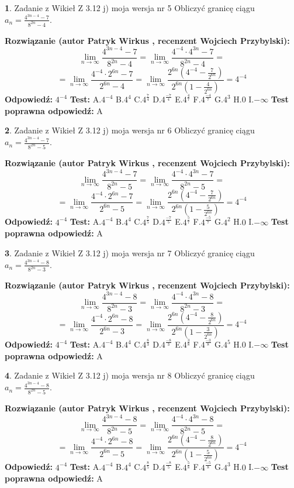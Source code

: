 \documentclass[12pt, a4paper]{article}
\theoremstyle{definition} %
\newtheorem{zad}{}
\newcommand{\zadStart}[1]{\begin{zad}#1\newline}
\newcommand{\zadStop}{\end{zad}}
\newcommand{\rozwStart}[2]{\noindent \textbf{Rozwiązanie (autor #1 , recenzent #2): }\newline}
\newcommand{\rozwStop}{\newline}
\newcommand{\odpStart}{\noindent \textbf{Odpowiedź:}\newline}
\newcommand{\odpStop}{\newline}
\newcommand{\testStart}{\noindent \textbf{Test:}\newline}
\newcommand{\testStop}{\newline}
\newcommand{\kluczStart}{\noindent \textbf{Test poprawna odpowiedź:}\newline}
\newcommand{\kluczStop}{\newline}
\begin{document}
\zadStart{Zadanie z Wikieł Z 3.12 j) moja wersja nr 5}
Obliczyć granicę ciągu $a_{n}=\frac{4^{3n-4}-7}{8^{2n}-4}$.
\zadStop
\rozwStart{Patryk Wirkus}{Wojciech Przybylski}
$$\lim\limits_{n\to\infty}\frac{4^{3n-4}-7}{8^{2n}-4}= \lim\limits_{n\to\infty}\frac{4^{-4} \cdot 4^{3n}-7}{8^{2n}-4}=$$
$$= \lim\limits_{n\to\infty}\frac{4^{-4} \cdot 2^{6n}-7}{2^{6n}-4}= \lim\limits_{n\to\infty}\frac{2^{6n}(4^{-4} - \frac{7}{2^{6n}})}{2^{6n}(1-\frac{4}{2^{6n}})}= 4^{-4}$$
\rozwStop
\odpStart
$4^{-4}$
\odpStop
\testStart
A.$4^{-4}$
B.$4^{4}$
C.$4^{\frac{7}{4}}$
D.$4^{\frac{-7}{4}}$
E.$4^{\frac{4}{7}}$
F.$4^{\frac{-4}{7}}$
G.$4^{3}$
H.$0$
I.$-\infty$
\testStop
\kluczStart
A
\kluczStop



\zadStart{Zadanie z Wikieł Z 3.12 j) moja wersja nr 6}
Obliczyć granicę ciągu $a_{n}=\frac{4^{3n-4}-7}{8^{2n}-5}$.
\zadStop
\rozwStart{Patryk Wirkus}{Wojciech Przybylski}
$$\lim\limits_{n\to\infty}\frac{4^{3n-4}-7}{8^{2n}-5}= \lim\limits_{n\to\infty}\frac{4^{-4} \cdot 4^{3n}-7}{8^{2n}-5}=$$
$$= \lim\limits_{n\to\infty}\frac{4^{-4} \cdot 2^{6n}-7}{2^{6n}-5}= \lim\limits_{n\to\infty}\frac{2^{6n}(4^{-4} - \frac{7}{2^{6n}})}{2^{6n}(1-\frac{5}{2^{6n}})}= 4^{-4}$$
\rozwStop
\odpStart
$4^{-4}$
\odpStop
\testStart
A.$4^{-4}$
B.$4^{4}$
C.$4^{\frac{7}{5}}$
D.$4^{\frac{-7}{5}}$
E.$4^{\frac{5}{7}}$
F.$4^{\frac{-5}{7}}$
G.$4^{2}$
H.$0$
I.$-\infty$
\testStop
\kluczStart
A
\kluczStop



\zadStart{Zadanie z Wikieł Z 3.12 j) moja wersja nr 7}
Obliczyć granicę ciągu $a_{n}=\frac{4^{3n-4}-8}{8^{2n}-3}$.
\zadStop
\rozwStart{Patryk Wirkus}{Wojciech Przybylski}
$$\lim\limits_{n\to\infty}\frac{4^{3n-4}-8}{8^{2n}-3}= \lim\limits_{n\to\infty}\frac{4^{-4} \cdot 4^{3n}-8}{8^{2n}-3}=$$
$$= \lim\limits_{n\to\infty}\frac{4^{-4} \cdot 2^{6n}-8}{2^{6n}-3}= \lim\limits_{n\to\infty}\frac{2^{6n}(4^{-4} - \frac{8}{2^{6n}})}{2^{6n}(1-\frac{3}{2^{6n}})}= 4^{-4}$$
\rozwStop
\odpStart
$4^{-4}$
\odpStop
\testStart
A.$4^{-4}$
B.$4^{4}$
C.$4^{\frac{8}{3}}$
D.$4^{\frac{-8}{3}}$
E.$4^{\frac{3}{8}}$
F.$4^{\frac{-3}{8}}$
G.$4^{5}$
H.$0$
I.$-\infty$
\testStop
\kluczStart
A
\kluczStop



\zadStart{Zadanie z Wikieł Z 3.12 j) moja wersja nr 8}
Obliczyć granicę ciągu $a_{n}=\frac{4^{3n-4}-8}{8^{2n}-5}$.
\zadStop
\rozwStart{Patryk Wirkus}{Wojciech Przybylski}
$$\lim\limits_{n\to\infty}\frac{4^{3n-4}-8}{8^{2n}-5}= \lim\limits_{n\to\infty}\frac{4^{-4} \cdot 4^{3n}-8}{8^{2n}-5}=$$
$$= \lim\limits_{n\to\infty}\frac{4^{-4} \cdot 2^{6n}-8}{2^{6n}-5}= \lim\limits_{n\to\infty}\frac{2^{6n}(4^{-4} - \frac{8}{2^{6n}})}{2^{6n}(1-\frac{5}{2^{6n}})}= 4^{-4}$$
\rozwStop
\odpStart
$4^{-4}$
\odpStop
\testStart
A.$4^{-4}$
B.$4^{4}$
C.$4^{\frac{8}{5}}$
D.$4^{\frac{-8}{5}}$
E.$4^{\frac{5}{8}}$
F.$4^{\frac{-5}{8}}$
G.$4^{3}$
H.$0$
I.$-\infty$
\testStop
\kluczStart
A
\kluczStop
\end{document}
